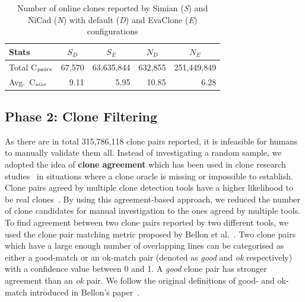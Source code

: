 \documentclass[sigconf,review, anonymous]{acmart}
\begin{document}
\begin{table}
	\centering
	\caption{Number of online clones reported by Simian (\textit{S}) and NiCad (\textit{N}) with default (\textit{D}) and EvaClone (\textit{E}) configurations}
	\label{tab:orig_stats}
	\begin{tabular}{l|r|r|r|r}
		\hline
		Stats & \multicolumn{1}{c|}{$S_D$} & \multicolumn{1}{c|}{$S_E$} & \multicolumn{1}{c|}{$N_D$} & \multicolumn{1}{c}{$N_E$} \\
		\hline
		Total C$_{\textrm{\textit{pairs}}}$ & 67,570 & 63,635,844 & 632,855 & 251,449,849 \\
		Avg.~C$_{\textrm{\textit{size}}}$ & 9.11 & 5.95 & 10.85 & 6.28 \\
		\hline
	\end{tabular} %
\end{table}

\subsection{Phase 2: Clone Filtering}
As there are in total 315,786,118 clone pairs reported, it is
infeasible for humans to manually validate them all. Instead of
investigating a random sample, we adopted the idea of \textbf{clone
  agreement} which has been used in clone research
studies~\cite{Funaro2010, Wang2013,cr2016ssbse} in situations where a
clone oracle is missing or impossible to establish. Clone pairs agreed
by multiple clone detection tools have a higher likelihood to be real
clones~\cite{cr2016ssbse}. By using this agreement-based approach, we
reduced the number of clone candidates for manual investigation to the
ones agreed by multiple tools. To find agreement between two clone
pairs reported by two different tools, we used the clone pair matching
metric proposed by Bellon et al.~\cite{Bellon2007}. Two clone pairs
which have a large enough number of overlapping lines can be
categorised as either a good-match or an ok-match pair (denoted as
\textit{good} and \textit{ok} respectively) with a confidence value
between 0 and 1. A \textit{good} clone pair has stronger agreement
than an \textit{ok} pair. We follow the original definitions of good-
and ok-match introduced in Bellon's paper~\cite{Bellon2007}.
\end{document}
